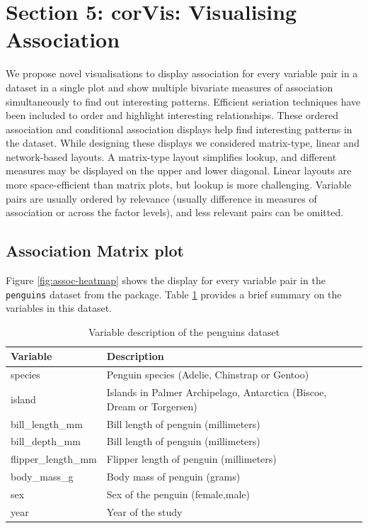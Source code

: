 \hypertarget{section-5-corvis-visualising-association}{%
\section{Section 5: corVis: Visualising
Association}\label{section-5-corvis-visualising-association}}

We propose novel visualisations to display association for every
variable pair in a dataset in a single plot and show multiple bivariate
measures of association simultaneously to find out interesting patterns.
Efficient seriation techniques have been included to order and highlight
interesting relationships. These ordered association and conditional
association displays help find interesting patterns in the dataset.
While designing these displays we considered matrix-type, linear and
network-based layouts. A matrix-type layout simplifies lookup, and
different measures may be displayed on the upper and lower diagonal.
Linear layouts are more space-efficient than matrix plots, but lookup is
more challenging. Variable pairs are usually ordered by relevance
(usually difference in measures of association or across the factor
levels), and less relevant pairs can be omitted.

\hypertarget{association-matrix-plot}{%
\subsection{Association Matrix plot}\label{association-matrix-plot}}

Figure \ref{fig:assoc-heatmap} shows the display for every variable pair
in the \texttt{penguins} dataset from the 
package. Table \ref{tab:penguins} provides a brief summary on the
variables in this dataset.

\begin{Schunk}
\begin{table}

\caption{\label{tab:penguins}Variable description of the penguins dataset}
\centering
\begin{tabular}[t]{ll}
\toprule
Variable & Description\\
\midrule
species & Penguin species (Adelie, Chinstrap or Gentoo)\\
island & Islands in Palmer Archipelago, Antarctica (Biscoe, Dream or Torgersen)\\
bill\_length\_mm & Bill length of penguin (millimeters)\\
bill\_depth\_mm & Bill length of penguin (millimeters)\\
flipper\_length\_mm & Flipper length of penguin (millimeters)\\
\addlinespace
body\_mass\_g & Body mass of penguin (grams)\\
sex & Sex of the penguin (female,male)\\
year & Year of the study\\
\bottomrule
\end{tabular}
\end{table}

\end{Schunk}

